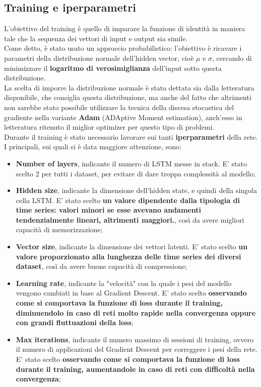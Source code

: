 \subsection{Training e iperparametri}
L'obiettivo del training è quello di imparare la funzione di identità in maniera tale che la sequenza dei vettori di input e output sia simile.\\ 
Come detto, è stato usato un approccio probabilistico: l'obiettivo è ricavare i parametri della distribuzione normale dell'hidden vector, cioè $\mu$ e $\sigma$, cercando di minimizzare il \textbf{logaritmo di verosimiglianza} dell'input sotto questa distribuzione.\\
La scelta di imporre la distribuzione normale è stata dettata sia dalla letteratura disponibile, che consiglia questa distribuzione, ma anche del fatto che altrimenti non sarebbe stato possibile utilizzare la tecnica della discesa stocastica del gradiente nella variante \textbf{Adam} (ADAptive Moment estimation), anch'esso in letteratura ritenuto il miglior optimizer per questo tipo di problemi.
\\
Durante il training è stato necessario lavorare sui tanti \textbf{iperparametri} della rete. I principali, sui quali si è data maggiore attenzione, sono:
\begin{itemize}
	\item \textbf{Number of layers}, indicante il numero di LSTM messe in stack. E' stato scelto 2 per tutti i dataset, per evitare di dare troppa complessità al modello;
	
	\item \textbf{Hidden size}, indicante la dimensione dell'hidden state, e quindi della singola cella LSTM. E' stato scelto \textbf{un valore dipendente dalla tipologia di time series: valori minori se esse avevano andamenti tendenzialmente lineari, altrimenti maggiori.}, così da avere migliori capacità di memorizzazione;
	
	\item \textbf{Vector size}, indicante la dimensione dei vettori latenti. E' stato scelto \textbf{un valore proporzionato alla lunghezza delle time series dei diversi dataset}, così da avere buone capacità di compressione;
	
	\item \textbf{Learning rate}, indicante la "velocità" con la quale i pesi del modello vengono cambiati in base al Gradient Descent. E' stato scelto \textbf{osservando come si comportava la funzione di loss durante il training, diminuendolo in caso di reti molto rapide nella convergenza oppure con grandi fluttuazioni della loss};
	
	\item \textbf{Max iterations}, indicante il numero massimo di sessioni di training, ovvero il numero di applicazioni del Gradient Descent per correggere i pesi della rete. E' stato scelto \textbf{osservando come si comportava la funzione di loss durante il training, aumentandole in caso di reti con difficoltà nella convergenza};
	
\end{itemize}
